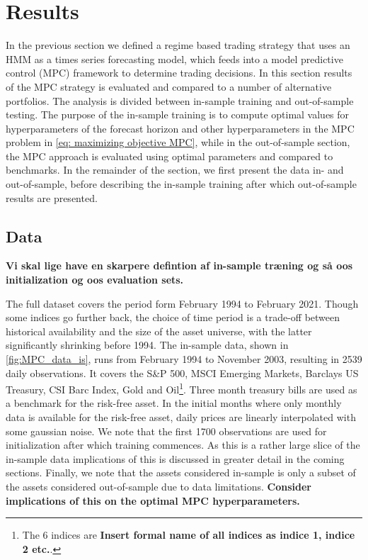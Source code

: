 \section{Results}

In the previous section we defined a regime based trading strategy that uses an HMM as a times series forecasting model, which feeds into a model predictive control (MPC) framework to determine trading decisions. In this section results of the MPC strategy is evaluated and compared to a number of alternative portfolios. The analysis is divided between in-sample training and out-of-sample testing. The purpose of the in-sample training is to compute optimal values for hyperparameters of the forecast horizon and other hyperparameters in the MPC problem in \cref{eq: maximizing objective MPC}, while in the out-of-sample section, the MPC approach is evaluated using optimal parameters and compared to benchmarks. In the remainder of the section, we first present the data in- and out-of-sample, before describing the in-sample training after which out-of-sample results are presented.

\subsection{Data}

\textbf{Vi skal lige have en skarpere defintion af in-sample træning og så oos initialization og oos evaluation sets.}

The full dataset covers the period form February 1994 to February 2021. Though some indices go further back, the choice of time period is a trade-off between historical availability and the size of the asset universe, with the latter significantly shrinking before 1994. The in-sample data, shown in \cref{fig:MPC_data_is}, runs from February 1994 to November 2003, resulting in 2539 daily observations. It covers the S\&P 500, MSCI Emerging Markets, Barclays US Treasury, CSI Barc Index, Gold and Oil\footnote{
The 6 indices are \textbf{Insert formal name of all indices as indice 1, indice 2 etc.}.
}.
Three month treasury bills are used as a benchmark for the risk-free asset. In the initial months where only monthly data is available for the risk-free asset, daily prices are linearly interpolated with some gaussian noise. We note that the first 1700 observations are used for initialization after which training commences. As this is a rather large slice of the in-sample data implications of this is discussed in greater detail in the coming sections. Finally, we note that the assets considered in-sample is only a subset of the assets considered out-of-sample due to data limitations. \textbf{Consider implications of this on the optimal MPC hyperparameters.}

